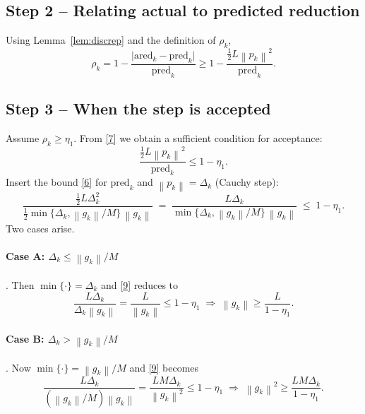 \documentclass{article}
\newcommand{\norm}[1]{\left\lVert#1\right\rVert}
\begin{document}
\subsection*{Step 2 – Relating actual to predicted reduction}
Using Lemma~\ref{lem:discrep} and the definition of $\rho_{k}$,
\[
\rho_{k}
=1-\frac{\bigl|\text{ared}_{k}-\text{pred}_{k}\bigr|}{\text{pred}_{k}}
\ge 1-\frac{\tfrac12 L\norm{p_{k}}^{2}}{\text{pred}_{k}} .
\tag{7}
\]

\subsection*{Step 3 – When the step is accepted}
Assume $\rho_{k}\ge\eta_{1}$.  
From \eqref{7} we obtain a sufficient condition for acceptance:
\[
\frac{\tfrac12 L\norm{p_{k}}^{2}}{\text{pred}_{k}}\le 1-\eta_{1}.
\tag{8}
\]
Insert the bound \eqref{6} for $\text{pred}_{k}$ and $\norm{p_{k}}=\Delta_{k}$ (Cauchy step):
\[
\frac{\tfrac12 L\Delta_{k}^{2}}
{\tfrac12\min\!\{\Delta_{k},\norm{g_{k}}/M\}\,\norm{g_{k}}}
\;=\;
\frac{L\Delta_{k}}
{\min\!\{\Delta_{k},\norm{g_{k}}/M\}\,\norm{g_{k}}}
\;\le\;1-\eta_{1}.
\tag{9}
\]
Two cases arise.

\paragraph{Case A: $\Delta_{k}\le \norm{g_{k}}/M$}.  
Then $\min\{\cdot\}=\Delta_{k}$ and \eqref{9} reduces to
\[
\frac{L\Delta_{k}}{\Delta_{k}\norm{g_{k}}}= \frac{L}{\norm{g_{k}}}\le 1-\eta_{1}
\;\Longrightarrow\;
\norm{g_{k}}\ge \frac{L}{1-\eta_{1}} .
\tag{10}
\]

\paragraph{Case B: $\Delta_{k}> \norm{g_{k}}/M$}.  
Now $\min\{\cdot\}= \norm{g_{k}}/M$ and \eqref{9} becomes
\[
\frac{L\Delta_{k}}{(\norm{g_{k}}/M)\norm{g_{k}}}
= \frac{LM\Delta_{k}}{\norm{g_{k}}^{2}}
\le 1-\eta_{1}
\;\Longrightarrow\;
\norm{g_{k}}^{2}\ge \frac{LM\Delta_{k}}{1-\eta_{1}} .
\tag{11}
\]
\end{document}
